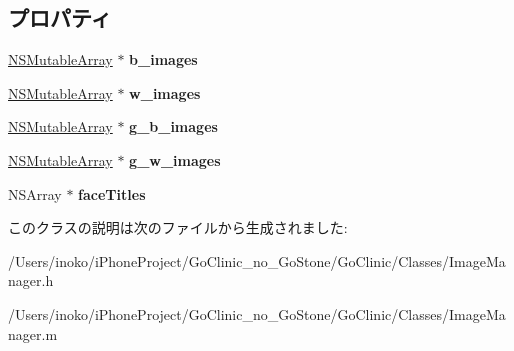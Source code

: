 \subsection*{プロパティ}
\begin{DoxyCompactItemize}
\item 
\hypertarget{interface_image_manager_a5de8f8686de715e7dcc7a8e10dce8485}{
\hyperlink{class_n_s_mutable_array}{NSMutableArray} $\ast$ {\bfseries b\_\-images}}
\label{interface_image_manager_a5de8f8686de715e7dcc7a8e10dce8485}

\item 
\hypertarget{interface_image_manager_a38eee1b568c64e42c98b96f945faad4c}{
\hyperlink{class_n_s_mutable_array}{NSMutableArray} $\ast$ {\bfseries w\_\-images}}
\label{interface_image_manager_a38eee1b568c64e42c98b96f945faad4c}

\item 
\hypertarget{interface_image_manager_a3a59b9ed527a4641a459511e51747fd5}{
\hyperlink{class_n_s_mutable_array}{NSMutableArray} $\ast$ {\bfseries g\_\-b\_\-images}}
\label{interface_image_manager_a3a59b9ed527a4641a459511e51747fd5}

\item 
\hypertarget{interface_image_manager_ae744232e63b2fb9542d634f3219778cf}{
\hyperlink{class_n_s_mutable_array}{NSMutableArray} $\ast$ {\bfseries g\_\-w\_\-images}}
\label{interface_image_manager_ae744232e63b2fb9542d634f3219778cf}

\item 
\hypertarget{interface_image_manager_ae727a8af9339f8da0e2eb2a0a81070ba}{
NSArray $\ast$ {\bfseries faceTitles}}
\label{interface_image_manager_ae727a8af9339f8da0e2eb2a0a81070ba}

\end{DoxyCompactItemize}


このクラスの説明は次のファイルから生成されました:\begin{DoxyCompactItemize}
\item 
/Users/inoko/iPhoneProject/GoClinic\_\-no\_\-GoStone/GoClinic/Classes/ImageManager.h\item 
/Users/inoko/iPhoneProject/GoClinic\_\-no\_\-GoStone/GoClinic/Classes/ImageManager.m\end{DoxyCompactItemize}
